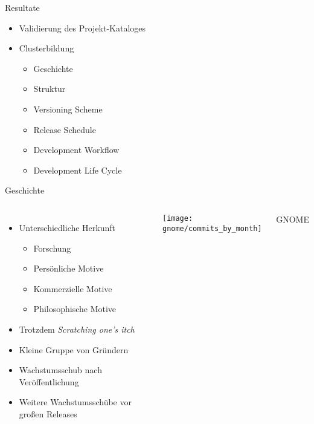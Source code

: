 \documentclass[11pt]{beamer}
\newlength{\colwidth}
\begin{document}
\begin{frame}{Resultate}
  \begin{itemize}
    \item Validierung des Projekt-Kataloges
    \item Clusterbildung
    \begin{itemize}
      \item Geschichte
      \item Struktur
      \item Versioning Scheme
      \item Release Schedule
      \item Development Workflow
      \item Development Life Cycle
    \end{itemize}
  \end{itemize}
\end{frame}

\begin{frame}{Geschichte}
  \begin{columns}
  \column{\colwidth}
  \begin{itemize}
    \item Unterschiedliche Herkunft
    \begin{itemize}
      \item Forschung
      \item Persönliche Motive
      \item Kommerzielle Motive
      \item Philosophische Motive
    \end{itemize}
    \item Trotzdem \emph{Scratching one's itch}
    \item Kleine Gruppe von Gründern
    \item Wachstumsschub nach Veröffentlichung
    \item Weitere Wachstumsschübe vor großen Releases
  \end{itemize}
  \column{\colwidth}
    \texttt{[image: gnome/commits\_by\_month]}

    {\tiny\hfill
    GNOME
    }
  \end{columns}
\end{frame}
\end{document}
